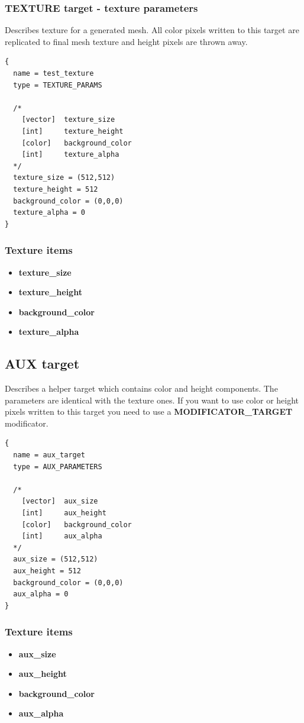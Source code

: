 \documentclass[9pt]{article}
\begin{document}
\subsubsection{TEXTURE target - texture parameters}
Describes texture for a generated mesh. All color pixels written to this
target are replicated to final mesh texture and height pixels are thrown away.
\begin{verbatim}
{
  name = test_texture
  type = TEXTURE_PARAMS

  /*
    [vector]  texture_size
    [int]     texture_height
    [color]   background_color
    [int]     texture_alpha
  */
  texture_size = (512,512)  
  texture_height = 512
  background_color = (0,0,0)
  texture_alpha = 0
}
\end{verbatim}
\subsubsection*{Texture items}
\begin{itemize}
\item{\bf texture\_size}
\item{\bf texture\_height}
\item{\bf background\_color}
\item{\bf texture\_alpha}
\end{itemize}

\subsection{AUX target}
Describes a helper target which contains color and height components. 
The parameters are identical with the texture ones. If you want to use color 
or height pixels written to this target you need to use a {\bf MODIFICATOR\_TARGET}
modificator.
\begin{verbatim}
{
  name = aux_target
  type = AUX_PARAMETERS

  /*
    [vector]  aux_size
    [int]     aux_height
    [color]   background_color
    [int]     aux_alpha
  */
  aux_size = (512,512)  
  aux_height = 512
  background_color = (0,0,0)
  aux_alpha = 0
}
\end{verbatim}
\subsubsection*{Texture items}
\begin{itemize}
\item{\bf aux\_size}
\item{\bf aux\_height}
\item{\bf background\_color}
\item{\bf aux\_alpha}
\end{itemize}
\end{document}
